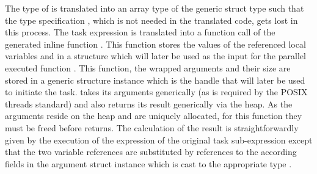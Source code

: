 The type of  is translated into an array type of the generic  struct type such that the type specification , which is not needed in the translated code, gets lost in this process. The task expression  is translated into a function call of the generated inline function . This function stores the values of the referenced local variables  and  in a structure which will later be used as the input for the parallel executed function . This function, the wrapped arguments and their size are stored in a generic  structure instance which is the handle that will later be used to initiate the task.  takes its arguments generically (as is required by the POSIX threads standard) and also returns its result generically via the heap. As the arguments reside on the heap and are uniquely allocated, for this function they must be freed before  returns. The calculation of the result is straightforwardly given by the execution of the expression of the original task sub-expression  except that the two variable references are substituted by references to the according fields in the argument struct instance  which is cast to the appropriate type .

